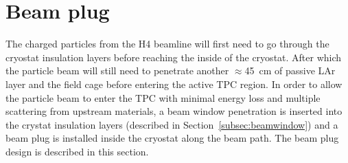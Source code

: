 \section{Beam plug}
\label{sec:beamplug}
The charged particles from the H4 beamline will first need to go through the cryostat insulation layers before reaching the inside of the cryostat. After which the particle beam will still need to penetrate another $\approx$45~cm of passive LAr layer and the field cage before entering the active TPC region. In order to allow the particle beam to enter the TPC with minimal energy loss and multiple scattering from upstream materials, a beam window penetration is inserted into the crystat insulation layers (described in Section~\ref{subsec:beamwindow}) and a beam plug is installed inside the cryostat along the beam path. The beam plug design is described in this section.

